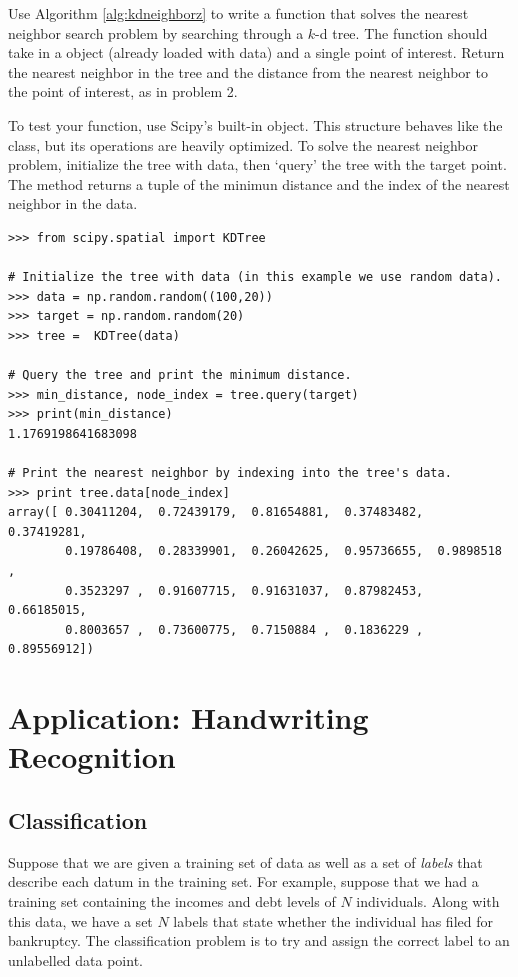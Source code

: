 \begin{problem}
Use Algorithm \ref{alg:kdneighborz} to write a function that solves the nearest neighbor search problem by searching through a $k$-d tree.
The function should take in a  object (already loaded with data) and a single point of interest.
Return the nearest neighbor in the tree and the distance from the nearest neighbor to the point of interest, as in problem 2.

To test your function, use Scipy's built-in  object. This structure behaves like the  class, but its operations are heavily optimized. To solve the nearest neighbor problem, initialize the tree with data, then `query' the tree with the target point. The  method returns a tuple of the minimun distance and the index of the nearest neighbor in the data.

\begin{lstlisting}
>>> from scipy.spatial import KDTree

# Initialize the tree with data (in this example we use random data).
>>> data = np.random.random((100,20))
>>> target = np.random.random(20)
>>> tree =  KDTree(data)

# Query the tree and print the minimum distance.
>>> min_distance, node_index = tree.query(target)
>>> print(min_distance)
1.1769198641683098

# Print the nearest neighbor by indexing into the tree's data.
>>> print tree.data[node_index]
array([ 0.30411204,  0.72439179,  0.81654881,  0.37483482,  0.37419281,
        0.19786408,  0.28339901,  0.26042625,  0.95736655,  0.9898518 ,
        0.3523297 ,  0.91607715,  0.91631037,  0.87982453,  0.66185015,
        0.8003657 ,  0.73600775,  0.7150884 ,  0.1836229 ,  0.89556912])
\end{lstlisting}
\end{problem}

\section*{Application: Handwriting Recognition}

\subsection*{Classification}

Suppose that we are given a training set of data as well as a set of \emph{labels} that describe each datum in the training set.
For example, suppose that we had a training set containing the incomes and debt levels of $N$ individuals.
Along with this data, we have a set $N$ labels that state whether the individual has filed for bankruptcy.
The classification problem is to try and assign the correct label to an unlabelled data point.

